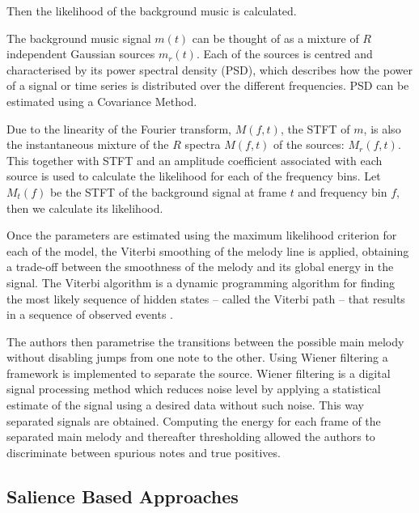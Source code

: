 Then the likelihood of the background music is calculated.

The background music signal $m(t)$ can be thought of as a mixture of $R$ independent Gaussian sources $m_{r}(t)$. Each of the sources is centred and characterised by its power spectral density (PSD), which describes how the power of a signal or time series is distributed over the different frequencies. PSD can be estimated using a Covariance Method.

Due to the linearity of the Fourier transform, $M(f,t)$, the STFT of $m$, is also the instantaneous mixture of the $R$ spectra $M(f,t)$ of the sources: $M_{r}(f,t)$.
This together with STFT and an amplitude coefficient associated with each source is used to calculate the likelihood for each of the frequency bins. Let $M_{t}(f)$ be the STFT of the background signal at frame $t$ and frequency bin $f$, then we calculate its likelihood.

Once the parameters are estimated using the maximum likelihood criterion for each of the model, the Viterbi smoothing of the melody line is applied, obtaining a trade-off between the smoothness of the melody and its global energy in the signal. The Viterbi algorithm is a dynamic programming algorithm for finding the most likely sequence of hidden states – called the Viterbi path – that results in a sequence of observed events \cite{viterbi}.
 
The authors then parametrise the transitions between the possible main melody without disabling jumps from one note to the other. Using Wiener filtering a framework is implemented to separate the source. Wiener filtering is a digital signal processing method which reduces noise level by applying a statistical estimate of the signal using a desired data without such noise. This way separated signals are obtained. Computing the energy for each frame of the separated main melody and thereafter thresholding allowed the authors to discriminate between spurious notes and true positives.

\vspace{20pt}


\subsection{Salience Based Approaches}

